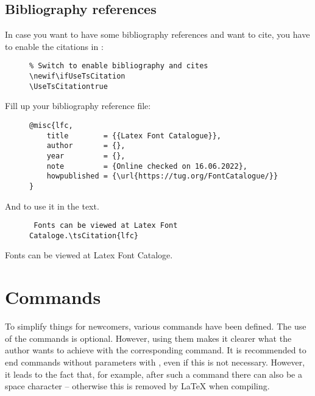 \subsection{Bibliography references}\label{subsec:Bibliography references}

In case you want to have some bibliography references and want to cite, you
have to enable the citations in :

\begin{figure}[H]
    \small
    \centering
    \begin{BVerbatim}
\newif\ifUseTsCitation
\UseTsCitationtrue
    \end{BVerbatim}
\end{figure}

Fill up your bibliography reference file:

\begin{figure}[H]
    \small
    \centering
    \begin{BVerbatim}
@misc{lfc,
    title        = {{Latex Font Catalogue}},
    author       = {},
    year         = {},
    note         = {Online checked on 16.06.2022},
    howpublished = {\url{https://tug.org/FontCatalogue/}}
}
    \end{BVerbatim}
\end{figure}

And to use it in the text.

\begin{figure}[H]
    \small
    \centering
    \begin{BVerbatim}
 Fonts can be viewed at Latex Font Cataloge.\tsCitation{lfc}
    \end{BVerbatim}
\end{figure}

Fonts can be viewed at Latex Font Cataloge.

\section{Commands}
\label{sec:Commands}

To simplify things for newcomers, various commands have been defined. The use
of the commands is optional. However, using them makes it clearer what the
author wants to achieve with the corresponding command. It is recommended to
end commands without parameters with \tsTextMonospace{\{\}}, even if this is
not necessary. However, it leads to the fact that, for example, after such a
command there can also be a space character -- otherwise this is removed by
\LaTeX{} when compiling.

